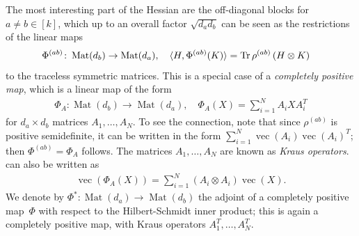 \documentclass[aos]{imsart}
\theoremstyle{definition}
\numberwithin{equation}{section}
\DeclareMathOperator{\Mat}{Mat}
\DeclareMathOperator{\tr}{Tr}
\DeclareMathOperator{\PD}{PD}
\DeclareMathOperator{\vect}{vec}
\newcommand{\ot}{\otimes}
\begin{document}
The most interesting part of the Hessian are the off-diagonal blocks for $a\neq b\in[k]$, which up to an overall factor $\sqrt{d_a d_b}$ can be seen as the restrictions of the linear maps
\begin{align}\label{eq:hessian channel}
  \Phi^{(ab)} \colon \Mat(d_b) \to \Mat(d_a), \quad \braket{H, \Phi^{(ab)}(K)} &= \tr \rho^{(ab)} \left( H \ot K \right)
\end{align}
to the traceless symmetric matrices.
This is a special case of a \emph{completely positive map}, which is a linear map of the form
\begin{align}\label{eq:def cp}
  \Phi_A \colon \Mat(d_b) \to \Mat(d_a), \quad \Phi_A(X) = \sum_{i=1}^N A_i X A_i^T
\end{align}
for $d_a\times d_b$ matrices $A_1,\dots,A_N$.
To see the connection, note that since $\rho^{(ab)}$ is positive semidefinite, it can be written in the form $\sum_{i=1}^N \vect(A_i) \vect(A_i)^T$; then $\Phi^{(ab)} = \Phi_A$ follows.
The matrices $A_1,\dots,A_N$ are known as \emph{Kraus operators}.
 can also be written as
\begin{align}\label{eq:vec rep}
  \vect(\Phi_A(X)) = \sum_{i=1}^N (A_i \ot A_i) \vect(X).
\end{align}
We denote by $\Phi^*\colon\Mat(d_a)\to\Mat(d_b)$ the adjoint of a completely positive map~$\Phi$ with respect to the Hilbert-Schmidt inner product; this is again a completely positive map, with Kraus operators $A_1^T,\dots,A_N^T$.
\end{document}
